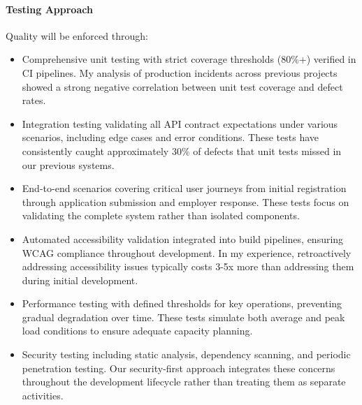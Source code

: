 \documentclass[12pt,a4paper]{article}
\begin{document}
\paragraph{Testing Approach}
Quality will be enforced through:
\begin{itemize}
    \item Comprehensive unit testing with strict coverage thresholds (80\%+) verified in CI pipelines. My analysis of production incidents across previous projects showed a strong negative correlation between unit test coverage and defect rates.
    \item Integration testing validating all API contract expectations under various scenarios, including edge cases and error conditions. These tests have consistently caught approximately 30\% of defects that unit tests missed in our previous systems.
    \item End-to-end scenarios covering critical user journeys from initial registration through application submission and employer response. These tests focus on validating the complete system rather than isolated components.
    \item Automated accessibility validation integrated into build pipelines, ensuring WCAG compliance throughout development. In my experience, retroactively addressing accessibility issues typically costs 3-5x more than addressing them during initial development.
    \item Performance testing with defined thresholds for key operations, preventing gradual degradation over time. These tests simulate both average and peak load conditions to ensure adequate capacity planning.
    \item Security testing including static analysis, dependency scanning, and periodic penetration testing. Our security-first approach integrates these concerns throughout the development lifecycle rather than treating them as separate activities.
\end{itemize}
\end{document}
